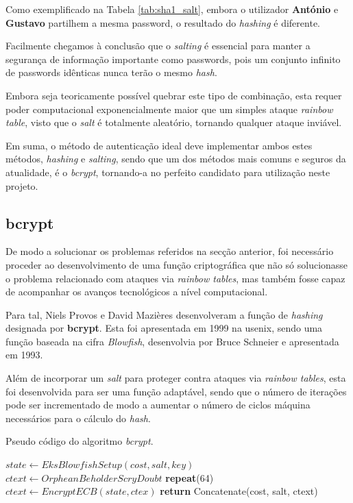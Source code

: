 Como exemplificado na Tabela \ref{tab:sha1_salt}, embora o utilizador \textbf{António} e \textbf{Gustavo} partilhem a mesma password, o resultado do \emph{hashing} é diferente.

Facilmente chegamos à conclusão que o \emph{salting} é essencial para manter a segurança de informação importante como passwords, pois um conjunto infinito de passwords idênticas nunca terão o mesmo \emph{hash}.

Embora seja teoricamente possível quebrar este tipo de combinação, esta requer poder computacional exponencialmente maior que um simples ataque \emph{rainbow table}, visto que o \emph{salt} é totalmente aleatório, tornando qualquer ataque inviável.

Em suma, o método de autenticação ideal deve implementar ambos estes métodos\cite{contini2015method}, \emph{hashing} e \emph{salting}, sendo que um dos métodos mais comuns e seguros da atualidade, é o \emph{bcrypt}, tornando-a no perfeito candidato para utilização neste projeto.

\cleardoublepage
\subsection{bcrypt}

De modo a solucionar os problemas referidos na secção anterior, foi necessário proceder ao desenvolvimento de uma função criptográfica que não só solucionasse o problema relacionado com ataques via \emph{rainbow tables}, mas também fosse capaz de acompanhar os avanços tecnológicos a nível computacional.

Para tal, Niels Provos e David Mazières desenvolveram a função de \emph{hashing} designada por \textbf{bcrypt}\cite{provos1999future}. Esta foi apresentada em 1999 na \gls{usenix}, sendo uma função baseada na cifra \emph{Blowfish}, desenvolvia por Bruce Schneier e apresentada em 1993.

Além de incorporar um \emph{salt} para proteger contra ataques via \emph{rainbow tables}, esta foi desenvolvida para ser uma função adaptável, sendo que o número de iterações pode ser incrementado de modo a aumentar o número de ciclos máquina necessários para o cálculo do \emph{hash}. 

\begin{algorithm}
    \caption{Pseudo código do algoritmo \emph{bcrypt}.}
    \begin{algorithmic}[1]
        \State $state\gets EksBlowfishSetup(cost,salt,key)$
        \State $ctext\gets OrpheanBeholderScryDoubt$
        \State \textbf{repeat}(64)
        \State \indent $ctext\gets EncryptECB(state, ctex)$
        \State \textbf{return} Concatenate(cost, salt, ctext)
    \EndFunction
    \end{algorithmic}
\end{algorithm}

